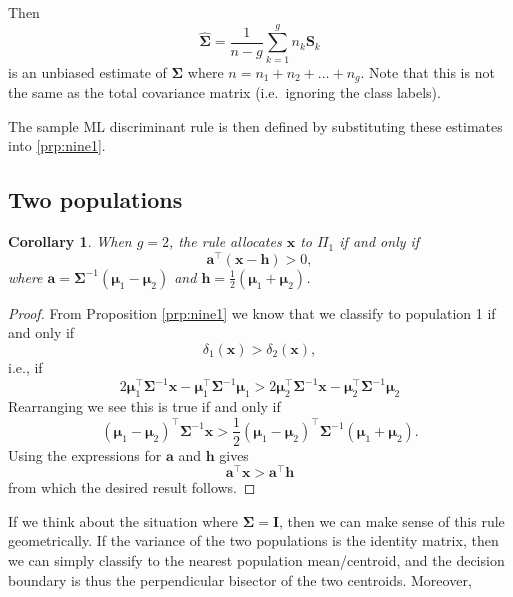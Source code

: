 \documentclass[
]{book}
\newtheorem{corollary}{Corollary}[chapter]
\theoremstyle{definition}
\theoremstyle{definition}
\theoremstyle{definition}
\theoremstyle{definition}
\theoremstyle{remark}
\begin{document}
Then
\begin{equation}
\widehat{\boldsymbol{\Sigma}} = \frac{1}{n-g} \sum_{k=1}^g n_k \mathbf S_k \label{eq:ldawithin}
 \end{equation}
is an unbiased estimate of \(\boldsymbol{\Sigma}\) where \(n = n_1 + n_2 + \ldots + n_g\). Note that this is not the same as the total covariance matrix (i.e.~ignoring the class labels).

The sample ML discriminant rule is then defined by substituting these estimates into \ref{prp:nine1}.

\hypertarget{two-populations}{%
\subsection{Two populations}\label{two-populations}}

\begin{corollary}
\protect\hypertarget{cor:nine2c}{}\label{cor:nine2c}When \(g=2\), the rule allocates \(\mathbf x\) to \(\Pi_1\) if and only if
\[\mathbf a^\top (\mathbf x- \mathbf h) > 0, \]
where \(\mathbf a= \boldsymbol{\Sigma}^{-1} ({\boldsymbol{\mu}}_1 - {\boldsymbol{\mu}}_2)\) and \(\mathbf h= \frac{1}{2} ({\boldsymbol{\mu}}_1 + {\boldsymbol{\mu}}_2)\).
\end{corollary}

\begin{proof}
From Proposition \ref{prp:nine1} we know that we classify to population 1 if and only if
\[\delta_1(\mathbf x)>\delta_2(\mathbf x),\]
i.e., if
\[2{\boldsymbol{\mu}}_1^\top \boldsymbol{\Sigma}^{-1} \mathbf x-{\boldsymbol{\mu}}_1^\top\boldsymbol{\Sigma}^{-1}{\boldsymbol{\mu}}_1> 2{\boldsymbol{\mu}}_2^\top \boldsymbol{\Sigma}^{-1} \mathbf x-{\boldsymbol{\mu}}_2^\top \boldsymbol{\Sigma}^{-1}{\boldsymbol{\mu}}_2\]
Rearranging we see this is true if and only if
\[({\boldsymbol{\mu}}_1-{\boldsymbol{\mu}}_2)^\top \boldsymbol{\Sigma}^{-1} \mathbf x> \frac{1}{2}({\boldsymbol{\mu}}_1-{\boldsymbol{\mu}}_2)^\top\boldsymbol{\Sigma}^{-1}({\boldsymbol{\mu}}_1+{\boldsymbol{\mu}}_2).\]
Using the expressions for \(\mathbf a\) and \(\mathbf h\) gives
\[\mathbf a^\top \mathbf x> \mathbf a^\top \mathbf h\]
from which the desired result follows.
\end{proof}

If we think about the situation where \(\boldsymbol{\Sigma}= \mathbf I\), then we can make sense of this rule geometrically. If the variance of the two populations is the identity matrix, then we can simply classify to the nearest population mean/centroid, and the decision boundary is thus the perpendicular bisector of the two centroids. Moreover,
\end{document}
